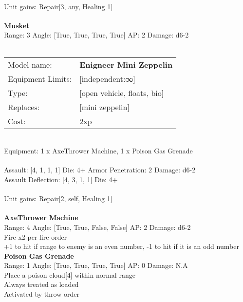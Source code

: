 \ \\
Unit gains: Repair[3, any, Healing 1]\\ 

\ \\
{\bf Musket } \\



Range: 3  Angle: [True, True, True, True] AP: 2 Damage: d6-2 \\




 
\ \\

\noindent
\begin{tabular}{ll}
Model name: &{\bf Enigneer Mini Zeppelin } \\
Equipment Limits: &[independent:∞] \\
Type: &[open vehicle, floats, bio] \\
Replaces: &[mini zeppelin] \\
Cost: & 2xp\\
\end{tabular}
\ \\
Equipment: 1 x AxeThrower Machine, 1 x Poison Gas Grenade \\
\ \\
Assault: [4, 1, 1, 1] Die: 4+ Armor Penetration: 2 Damage: d6-2 \\
Assault Deflection: [4, 3, 1, 1] Die: 4+\\
\indent  
\ \\
Unit gains: Repair[2, self, Healing 1]\\ 

\ \\
{\bf AxeThrower Machine } \\



Range: 4  Angle: [True, True, False, False] AP: 2 Damage: d6-2 \\
Fire x2 per fire order\\ 
+1 to hit if range to enemy is an even number, -1 to hit if it is an odd number\\ 




{\bf Poison Gas Grenade } \\



Range: 1  Angle: [True, True, True, True] AP: 0 Damage: N.A \\
Place a poison cloud[4] within normal range\\ 
Always treated as loaded\\ 
Activated by throw order\\ 




